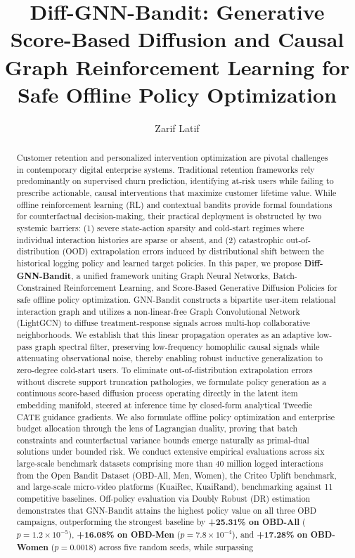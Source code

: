 \documentclass[preprint,12pt,3p]{elsarticle}
\begin{document}
\begin{frontmatter}

\title{Diff-GNN-Bandit: Generative Score-Based Diffusion and Causal Graph Reinforcement Learning for Safe Offline Policy Optimization}

\author{Zarif Latif}

\begin{abstract}
Customer retention and personalized intervention optimization are pivotal challenges in contemporary digital enterprise systems. Traditional retention frameworks rely predominantly on supervised churn prediction, identifying at-risk users while failing to prescribe actionable, causal interventions that maximize customer lifetime value. While offline reinforcement learning (RL) and contextual bandits provide formal foundations for counterfactual decision-making, their practical deployment is obstructed by two systemic barriers: (1) severe state-action sparsity and cold-start regimes where individual interaction histories are sparse or absent, and (2) catastrophic out-of-distribution (OOD) extrapolation errors induced by distributional shift between the historical logging policy and learned target policies. In this paper, we propose \textbf{Diff-GNN-Bandit}, a unified framework uniting Graph Neural Networks, Batch-Constrained Reinforcement Learning, and Score-Based Generative Diffusion Policies for safe offline policy optimization. GNN-Bandit constructs a bipartite user-item relational interaction graph and utilizes a non-linear-free Graph Convolutional Network (LightGCN) to diffuse treatment-response signals across multi-hop collaborative neighborhoods. We establish that this linear propagation operates as an adaptive low-pass graph spectral filter, preserving low-frequency homophilic causal signals while attenuating observational noise, thereby enabling robust inductive generalization to zero-degree cold-start users. To eliminate out-of-distribution extrapolation errors without discrete support truncation pathologies, we formulate policy generation as a continuous score-based diffusion process operating directly in the latent item embedding manifold, steered at inference time by closed-form analytical Tweedie CATE guidance gradients. We also formulate offline policy optimization and enterprise budget allocation through the lens of Lagrangian duality, proving that batch constraints and counterfactual variance bounds emerge naturally as primal-dual solutions under bounded risk. We conduct extensive empirical evaluations across six large-scale benchmark datasets comprising more than 40 million logged interactions from the Open Bandit Dataset (OBD-All, Men, Women), the Criteo Uplift benchmark, and large-scale micro-video platforms (KuaiRec, KuaiRand), benchmarking against 11 competitive baselines. Off-policy evaluation via Doubly Robust (DR) estimation demonstrates that GNN-Bandit attains the highest policy value on all three OBD campaigns, outperforming the strongest baseline by \textbf{+25.31\% on OBD-All} ($p = 1.2 \times 10^{-5}$), \textbf{+16.08\% on OBD-Men} ($p = 7.8 \times 10^{-4}$), and \textbf{+17.28\% on OBD-Women} ($p = 0.0018$) across five random seeds, while surpassing 
\end{abstract}
\end{frontmatter}
\end{document}
